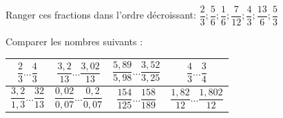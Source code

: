 \documentclass[a4paper]{book}
\begin{document}
    \begin{exercice}
        Ranger ces fractions dans l'ordre décroissant: 
        $\dfrac{2}{3} ; \dfrac{5}{6} ; \dfrac{1}{6} ; \dfrac{7}{12} ; \dfrac{4}{3} ; \dfrac{13}{6} ; \dfrac{5}{3}$

        \vspace{1cm}
    \end{exercice}


    \begin{exercice}
        Comparer les nombres suivants :

        \begin{center}
            \renewcommand{\arraystretch}{2.5}
            \begin{tabular}{|c|c|c|c|}
                \hline
                $\dfrac{2}{3} \dots \dfrac{4}{3}$ & $\dfrac{3,2}{13} \dots \dfrac{3,02}{13}$ & $\dfrac{5,89}{5,98} \dots \dfrac{3,52}{3,25}$ & $\dfrac{4}{3} \dots \dfrac{3}{4}$ \\ \hline
                $\dfrac{3,2}{1,3} \dots \dfrac{32}{13}$ & $\dfrac{0,02}{0,07} \dots \dfrac{0,2}{0,07}$ & $\dfrac{154}{125} \dots \dfrac{158}{189}$ & $\dfrac{1,82}{12} \dots \dfrac{1,802}{12}$ \\ \hline
            \end{tabular}
        \end{center}
    \end{exercice}  
\end{document}
